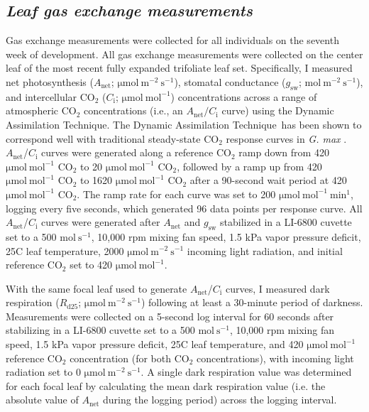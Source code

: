 \subsection{\textit{Leaf gas exchange measurements}}
\noindent Gas exchange measurements were collected for all individuals on the seventh week of development. All gas exchange measurements were collected on the center leaf of the most recent fully expanded trifoliate leaf set. Specifically, I measured net photosynthesis ($A_\mathrm{net}$; $\mathrm{\mu mol\ m^{-2}\ s^{-1}}$), stomatal conductance ($g_\mathrm{sw}$; $\mathrm{mol\ m^{-2}\ s^{-1}}$), and intercellular CO$_2$ ($C_\mathrm{i}$; $\mathrm{\mu mol\ mol^{-1}}$) concentrations across a range of atmospheric CO$_2$ concentrations (i.e., an $A_\mathrm{net}/C_\mathrm{i}$ curve) using the Dynamic Assimilation Technique\texttrademark. The Dynamic Assimilation Technique\texttrademark\ has been shown to correspond well with traditional steady-state CO$_2$ response curves in \textit{G. max} . $A_\mathrm{net}$/$C_\mathrm{i}$ curves were generated along a reference CO$_2$ ramp down from 420 $\mathrm{\mu mol\ mol^{-1}}$ CO$_2$ to 20 $\mathrm{\mu mol\ mol^{-1}}$ CO$_2$, followed by a ramp up from 420 $\mathrm{\mu mol\ mol^{-1}}$ CO$_2$ to 1620 $\mathrm{\mu mol\ mol^{-1}}$ CO$_2$ after a 90-second wait period at 420 $\mathrm{\mu mol\ mol^{-1}}$ CO$_2$. The ramp rate for each curve was set to 200 $\mathrm{\mu mol\ mol^{-1}\ min^{1}}$, logging every five seconds, which generated 96 data points per response curve. All $A_\mathrm{net}$/$C_\mathrm{i}$ curves were generated after $A_\mathrm{net}$ and $g_\mathrm{sw}$ stabilized in a LI-6800 cuvette set to a 500 $\mathrm{mol\ s^{-1}}$, 10,000 rpm mixing fan speed, 1.5 kPa vapor pressure deficit, 25\textdegree{}C leaf temperature, 2000 $\mathrm{\mu mol\ m^{-2}\ s^{-1}}$ incoming light radiation, and initial reference CO$_2$ set to 420 $\mathrm{\mu mol\ mol^{-1}}$.

With the same focal leaf used to generate $A_\mathrm{net}$/$C_\mathrm{i}$ curves, I measured dark respiration ($R_\mathrm{d25}$; $\mathrm{\mu mol\ m^{-2}\ s^{-1}}$) following at least a 30-minute period of darkness. Measurements were collected on a 5-second log interval for 60 seconds after stabilizing in a LI-6800 cuvette set to a 500 $\mathrm{mol\ s^{-1}}$, 10,000 rpm mixing fan speed, 1.5 kPa vapor pressure deficit, 25\textdegree{}C leaf temperature, and 420 $\mathrm{\mu mol\ mol^{-1}}$ reference CO$_2$ concentration (for both CO$_2$ concentrations), with incoming light radiation set to 0 $\mathrm{\mu mol\ m^{-2}\ s^{-1}}$. A single dark respiration value was determined for each focal leaf by calculating the mean dark respiration value (i.e. the absolute value of $A_\mathrm{net}$ during the logging period) across the logging interval.

